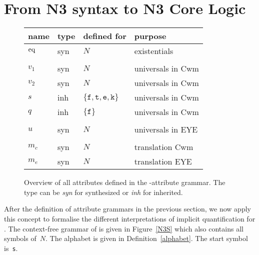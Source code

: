 \section{From N3 syntax to N3 Core Logic}
\begin{figure}\centering
\small
\begin{tabular}{llll}
\hline
name \hspace*{0.05\textwidth}
& type \hspace*{0.05\textwidth}
& defined for \hspace*{0.05\textwidth} 
&purpose \\
 \hline
 $\text{eq}$ & syn  & $ N$& existentials\\
 \\
 $v_1$ & syn &$ N$& universals in Cwm \\
 $v_2$ & syn &$ N$ & universals in Cwm\\
 $s$ & inh &$\{\texttt{f}, \texttt{t},\texttt{e}, \texttt{k}\}$& universals in Cwm \\
  $q$ & inh &$\{\texttt{f}\}$& universals in Cwm \\
  \\
  $u$ & syn &$ N$& universals in EYE \\
  \\
  $m_c$ & syn  &$ N$& translation Cwm\\
  $m_e$ &syn &$ N$& translation EYE \\
  \hline
\end{tabular}
\normalsize
\caption{Overview of all attributes defined in the \nthree-attribute grammar. The type can be \emph{syn} for synthesized or \emph{inh} for inherited. \label{attributes}}
\end{figure}

After the definition of attribute grammars in the previous section, 
we now apply this concept to 
formalise the different interpretations of implicit quantification for \nthreelogic. 
The context-free grammar of \nthree is given in Figure~\ref{N3S} which also contains all symbols of~$N$. The alphabet is given in Definition~\ref{alphabet}. 
The start symbol is~\texttt{s}.

